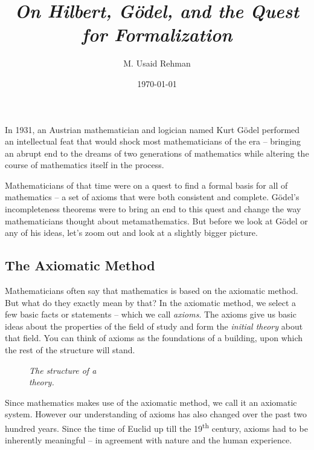\documentclass[a4paper, 12pt]{article}
\title{{\Large  \textit{On Hilbert, G\"{o}del, and the Quest for Formalization}}}
\author{M. Usaid Rehman}
\date{\today}
\newcommand{\godel}{G\"{o}del }
\newcommand{\godels}{G\"{o}del's }
\theoremstyle{definition}
\begin{document}
    \maketitle
    \setlength{\parskip}{0.75 em}
    
    In 1931, an Austrian mathematician and logician named Kurt \godel performed an intellectual feat
    that would shock most mathematicians of the era -- bringing an abrupt end to the dreams of two generations of mathematics  
    while altering the course of mathematics itself in the process. \cite{ben-ari_mathematical_2012}

    Mathematicians of that time were on a quest to find a formal basis for all of mathematics -- a 
    set of axioms that were both consistent and complete. \godels incompleteness theorems were to bring an 
    end to this quest and change the way mathematicians thought about metamathematics. But before we look at \godel or 
    any of his ideas, let's zoom out and look at a slightly bigger picture. 

    \subsection*{The Axiomatic Method}
    Mathematicians often say that mathematics is based on the axiomatic method. But what do they exactly mean by that? 
    In the axiomatic method, we select a few basic facts or statements -- which we call \emph{axioms}. The axioms give us basic ideas 
    about the properties of the field of study and form the \textit{initial theory} about that field.
    You can think of axioms as the foundations of a building, upon which the rest of the structure will stand. 
    
    \begin{wrapfigure}{l}{0.35\textwidth}
        \centering
        \caption{\textit{The structure of a  \\ theory.}}
        \vspace{-1 em}
        \label{theorystruct}
    \end{wrapfigure}
    Since mathematics makes use of the axiomatic method, we call it an axiomatic system. However our understanding of axioms has also changed 
    over the past two hundred years. Since the time of Euclid up till the 19\textsuperscript{th} century, axioms 
    had to be inherently meaningful -- in agreement with nature and the human experience. 
    
\end{document}
